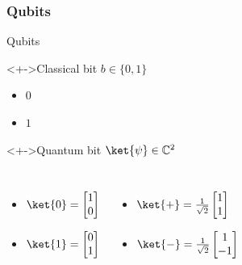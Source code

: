 \documentclass{beamer}
\begin{document}
\subsubsection*{Qubits}
\begin{frame}{Qubits}
\begin{linenumbers}
	\begin{block}<+->{Classical bit}
		$b \in \{0, 1\}$
		\begin{itemize}[<+->]
			\item $0$
			\item $1$
		\end{itemize}
	\end{block}

	\begin{block}<+->{Quantum bit}
		$\ket{\psi} \in \mathbb{C}^2$
		\begin{columns}[T,onlytextwidth]
				\begin{itemize}[<+->]
					\item $\ket{0} = \begin{bmatrix} 1 \\ 0 \end{bmatrix}$
					\item $\ket{1} = \begin{bmatrix} 0 \\ 1 \end{bmatrix}$
				\end{itemize}
				\begin{itemize}[<+->]
					\item $\ket{+} = \frac{1}{\sqrt{2}}\begin{bmatrix} 1 \\ 1 \end{bmatrix}$
					\item $\ket{-} = \frac{1}{\sqrt{2}}\begin{bmatrix} 1 \\ -1 \end{bmatrix}$
				\end{itemize}
		\end{columns}
	\end{block}
\end{linenumbers}
\end{frame}
\end{document}
